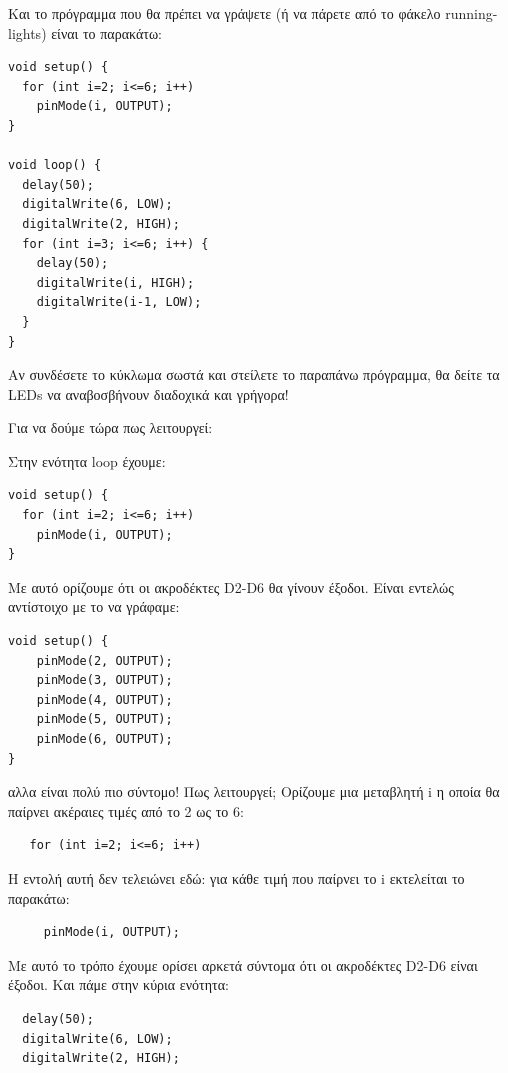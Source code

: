 \documentclass[a4paper,twoside,12pt]{article}
\begin{document}
Και το πρόγραμμα που θα πρέπει να γράψετε (ή να πάρετε από το φάκελο running-lights) είναι το παρακάτω:

\begin{verbatim}
void setup() {
  for (int i=2; i<=6; i++)
    pinMode(i, OUTPUT);
}

void loop() {
  delay(50);
  digitalWrite(6, LOW);
  digitalWrite(2, HIGH);
  for (int i=3; i<=6; i++) {
    delay(50);
    digitalWrite(i, HIGH);
    digitalWrite(i-1, LOW);
  }
}
\end{verbatim}

Αν συνδέσετε το κύκλωμα σωστά και στείλετε το παραπάνω πρόγραμμα, θα δείτε τα LEDs να αναβοσβήνουν διαδοχικά και γρήγορα!

Για να δούμε τώρα πως λειτουργεί:

Στην ενότητα loop έχουμε:

\begin{verbatim}
void setup() {
  for (int i=2; i<=6; i++)
    pinMode(i, OUTPUT);
}
\end{verbatim}

Με αυτό ορίζουμε ότι οι ακροδέκτες D2-D6 θα γίνουν έξοδοι. Είναι εντελώς αντίστοιχο με το να γράφαμε:

\begin{verbatim}
void setup() {
    pinMode(2, OUTPUT);
    pinMode(3, OUTPUT);
    pinMode(4, OUTPUT);
    pinMode(5, OUTPUT);
    pinMode(6, OUTPUT);
}
\end{verbatim}

αλλα είναι πολύ πιο σύντομο! Πως λειτουργεί; Ορίζουμε μια μεταβλητή i η οποία θα παίρνει ακέραιες τιμές από το 2 ως το 6:

\begin{verbatim}
   for (int i=2; i<=6; i++)
\end{verbatim}

Η εντολή αυτή δεν τελειώνει εδώ: για κάθε τιμή που παίρνει το i εκτελείται το παρακάτω:

\begin{verbatim}
     pinMode(i, OUTPUT);
\end{verbatim}

Με αυτό το τρόπο έχουμε ορίσει αρκετά σύντομα ότι οι ακροδέκτες D2-D6 είναι έξοδοι. Και πάμε στην κύρια ενότητα:

\begin{verbatim}
  delay(50);
  digitalWrite(6, LOW);
  digitalWrite(2, HIGH);
\end{verbatim}
\end{document}
